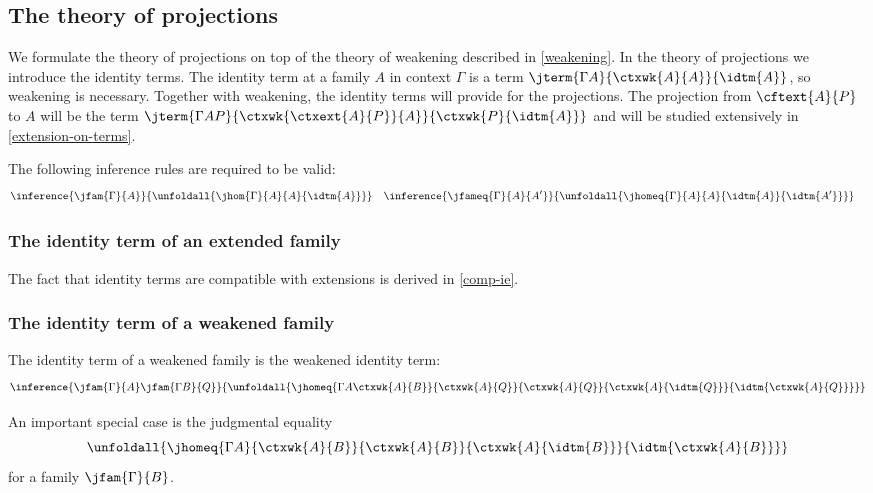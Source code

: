 \subsection{The theory of projections}
\label{identityterms}

We formulate the theory of projections on top of the theory of weakening
described in \autoref{weakening}. In the theory of projections we introduce
the identity terms. The identity term at a family $A$ in context $\Gamma$ is
a term $\jterm{{\Gamma}{A}}{\ctxwk{A}{A}}{\idtm{A}}$, so weakening is necessary.
Together with weakening, the identity terms will provide for the projections.
The projection from $\cftext{A}{P}$ to $A$ will be the term
$\jterm{{\Gamma}{{A}{P}}}{\ctxwk{\ctxext{A}{P}}{A}}{\ctxwk{P}{\idtm{A}}}$ and
will be studied extensively in \autoref{extension-on-terms}.

The following inference rules are required to be valid:
\begin{align}
& \inference
  { \jfam{\Gamma}{A}
    }
  { \unfoldall{\jhom{\Gamma}{A}{A}{\idtm{A}}}
    }
& & \inference
    { \jfameq{\Gamma}{A}{A'}
      }
    { \unfoldall{\jhomeq{\Gamma}{A}{A}{\idtm{A}}{\idtm{A'}}}
      }
\end{align}

\subsubsection{The identity term of an extended family}
The fact that identity terms are compatible with extensions is derived in
\autoref{comp-ie}.

\subsubsection{The identity term of a weakened family}
\label{comp-wi}
The identity term of a weakened family is the weakened identity term:
\begin{equation}
\inference
  { \jfam{\Gamma}{A}
    \jfam{{\Gamma}{B}}{Q}
    }
  { \unfoldall{\jhomeq
      {{{\Gamma}{A}}{\ctxwk{A}{B}}}
      {\ctxwk{A}{Q}}
      {\ctxwk{A}{Q}}
      {\ctxwk{A}{\idtm{Q}}}
      {\idtm{\ctxwk{A}{Q}}}
      }
    }
  \label{comp-wi-t}
\end{equation}

\begin{rmk}
An important special case is the judgmental equality
\begin{equation*}
\unfoldall{\jhomeq
      {{\Gamma}{A}}
      {\ctxwk{A}{B}}
      {\ctxwk{A}{B}}
      {\ctxwk{A}{\idtm{B}}}
      {\idtm{\ctxwk{A}{B}}}
      }
\end{equation*}
for a family $\jfam{\Gamma}{B}$.
\end{rmk}

